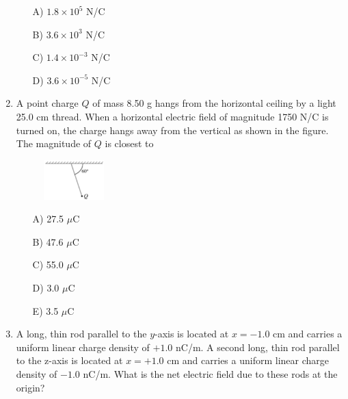 \begin{enumerate}
    \begin{multicols}{5}
    \begin{itemize}
        \item[A)] $1.8\times10^5$ N/C
        \item[B)] $3.6\times10^3$ N/C
        \item[C)] $1.4\times10^{-3}$ N/C
        \item[D)] $3.6\times10^{-5}$ N/C
    \end{itemize}
    \end{multicols}


    \item A point charge $Q$ of mass 8.50 g hangs from the horizontal ceiling by a light 25.0 cm thread. When a horizontal electric field of magnitude 1750 N/C is turned on, the charge hangs away from the vertical as shown in the figure. The magnitude of $Q$ is closest to

    \begin{figure}[H]
        \centering
        \includegraphics[width=0.22\textwidth]{figures-workshop01/problem-10.png}
    \end{figure}

    \begin{multicols}{5}
    \begin{itemize}
        \item[A)] 27.5 $\mu$C
        \item[B)] 47.6 $\mu$C
        \item[C)] 55.0 $\mu$C
        \item[D)] 3.0 $\mu$C
        \item[E)] 3.5 $\mu$C
    \end{itemize}
    \end{multicols}


    \item A long, thin rod parallel to the $y$-axis is located at $x = -1.0$ cm and carries a uniform linear charge density of $+1.0$ nC/m. A second long, thin rod parallel to the z-axis is located at $x=+1.0$ cm and carries a uniform linear charge density of $-1.0$ nC/m. What is the net electric field due to these rods at the origin?


\end{enumerate}
